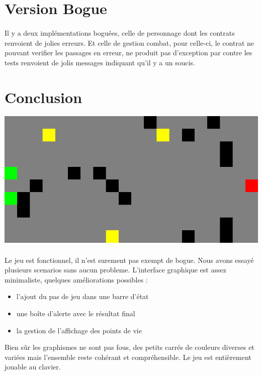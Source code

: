 \documentclass[a4paper,titlepage,openany,12pt]{report}
\begin{document}
\section*{Version Bogue}
\paragraph{}
Il y a deux implémentations boguées, celle de personnage dont les
contrats renvoient de jolies erreurs.
Et celle de gestion combat, pour celle-ci, le contrat ne pouvant
verifier les passages en erreur, ne produit pas d'exception par contre
les tests renvoient de jolis messages indiquant qu'il y a un soucis.



\section*{Conclusion}

\includegraphics[scale=0.3]{../saved}


\paragraph{}
Le jeu est fonctionnel, il n'est surement pas exempt de bogue. Nous
avons essayé plusieurs scenarios sans aucun probleme. L'interface
graphique est assez minimaliste, quelques améliorations possibles :
\begin{itemize}
\item l'ajout du pas de jeu dans une barre d'état
\item une boîte d'alerte avec le résultat final
\item la gestion de l'affichage des points de vie
\end{itemize}
Bien sûr les graphismes ne sont pas fous, des petits carrés de couleurs
diverses et variées mais l'ensemble reste cohérant et compréhensible.
Le jeu est entièrement jouable au clavier.
\end{document}
